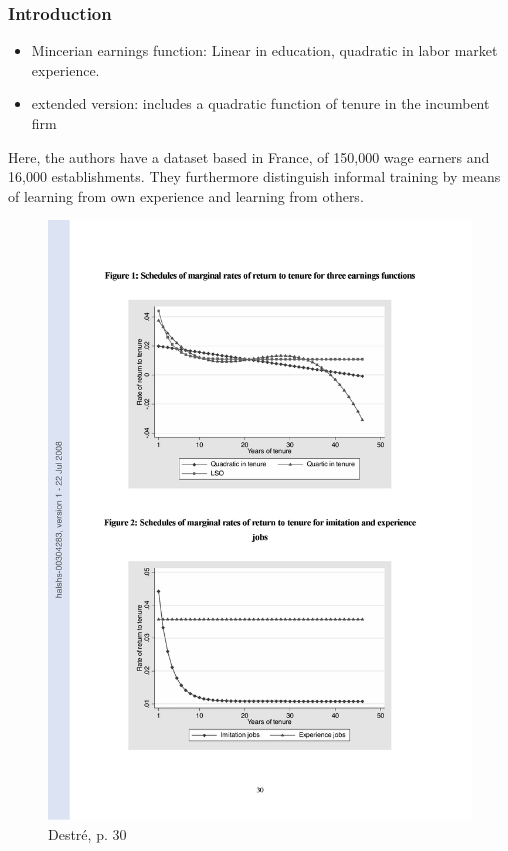 \documentclass[12pt,a4paper]{article}
\begin{document}
  \subsubsection{Introduction} %
  \label{ssub:Introduction}
  \begin{itemize}
    \item Mincerian earnings function: Linear in education, quadratic in labor market experience.
    \item extended version: includes a quadratic function of tenure in the incumbent firm
  \end{itemize}
  Here, the authors have a dataset based in France, of 150,000 wage earners and 16,000
  establishments. They furthermore distinguish informal training by means of learning from own
  experience and learning from others.
  
  \begin{figure}[htb]
        \centering
        \includegraphics[width=12cm]{dest_1.pdf}
        \caption{Destré, p. 30}
        \label{dest_1}
  \end{figure}
\end{document}
